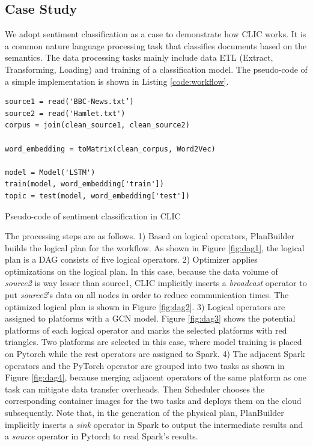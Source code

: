 \subsection{Case Study}
We adopt sentiment classification as a case to demonstrate how CLIC works. It is a common nature language processing task that classifies documents based on the semantics. The data processing tasks mainly include data ETL (Extract, Transforming, Loading) and training of a classification model. The pseudo-code of a simple implementation is shown in Listing \ref{code:workflow}.

\begin{listing}[ht]
\begin{verbatim}
source1 = read('BBC-News.txt’)
source2 = read('Hamlet.txt')
corpus = join(clean_source1, clean_source2)

word_embedding = toMatrix(clean_corpus, Word2Vec)
    
model = Model('LSTM')
train(model, word_embedding['train'])
topic = test(model, word_embedding['test'])
\end{verbatim}
\caption{Pseudo-code of sentiment classification in CLIC}
\label{code:workflow}
\end{listing}
The processing steps are as follows. 1) Based on logical operators, PlanBuilder builds the logical plan for the workflow. As shown in Figure \ref{fig:dag1}, the logical plan is a  DAG consists of five logical operators. 2) Optimizer applies optimizations on the logical plan. In this case, because the data volume of \textit{source2} is way lesser than source1, CLIC implicitly inserts a \textit{broadcast} operator to put \textit{source2}’s data on all nodes in order to reduce communication times. The optimized logical plan is shown in Figure \ref{fig:dag2}. 3) Logical operators are assigned to platforms with a GCN model. Figure \ref{fig:dag3} shows the potential platforms of each logical operator and marks the selected platforms with red triangles. Two platforms are selected in this case, where model training is placed on Pytorch while the rest operators are assigned to Spark. 4) The adjacent Spark operators and the PyTorch operator are grouped into two tasks as shown in Figure \ref{fig:dag4}, because merging adjacent operators of the same platform as one task can mitigate data transfer overheads. Then Scheduler chooses the corresponding container images for the two tasks and deploys them on the cloud subsequently. Note that, in the generation of the physical plan, PlanBuilder implicitly inserts a \textit{sink} operator in Spark to output the intermediate results and a \textit{source} operator in Pytorch to read Spark’s results.

